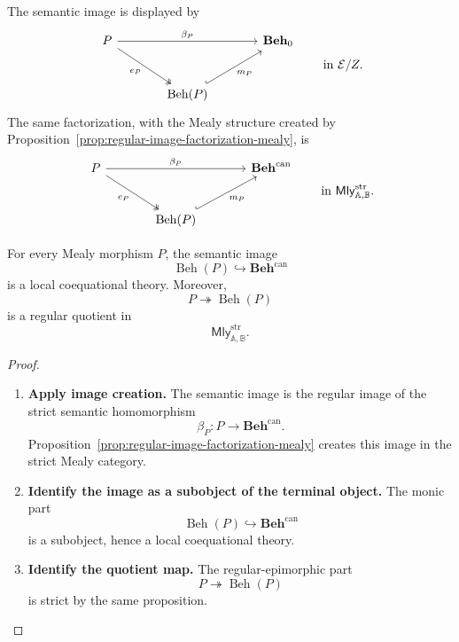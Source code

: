 The semantic image is displayed by
\[
\begin{tikzcd}[column sep=large, row sep=large]
    P
        \arrow[rr, "\beta_P"]
        \arrow[dr, two heads, "e_P"']
    &&
    \mathbf{Beh}_0
    \\
    &
    \operatorname{Beh}(P)
        \arrow[ur, hook, "m_P"']
    &
\end{tikzcd}
\qquad
\text{in }\mathcal E/Z.
\]
The same factorization, with the Mealy structure created by
Proposition~\ref{prop:regular-image-factorization-mealy}, is
\[
\begin{tikzcd}[column sep=large, row sep=large]
    P
        \arrow[rr, "\beta_P"]
        \arrow[dr, two heads, "e_P"']
    &&
    \mathbf{Beh}^{\mathrm{can}}
    \\
    &
    \operatorname{Beh}(P)
        \arrow[ur, hook, "m_P"']
    &
\end{tikzcd}
\qquad
\text{in }\mathsf{Mly}^{\mathrm{str}}_{\mathbb A,\mathbb B}.
\]

\begin{corollary}
\label{cor:semantic-images-are-coeq-theories}
    For every Mealy morphism \(P\), the semantic image
    \[
        \operatorname{Beh}(P)\hookrightarrow\mathbf{Beh}^{\mathrm{can}}
    \]
    is a local coequational theory. Moreover,
    \[
        P\twoheadrightarrow\operatorname{Beh}(P)
    \]
    is a regular quotient in
    \[
        \mathsf{Mly}^{\mathrm{str}}_{\mathbb A,\mathbb B}.
    \]
\end{corollary}

\begin{proof}
    \leavevmode
    \begin{enumerate}
        \item \textbf{Apply image creation.}
        The semantic image is the regular image of the strict semantic
        homomorphism
        \[
            \beta_P:P\to\mathbf{Beh}^{\mathrm{can}}.
        \]
        Proposition~\ref{prop:regular-image-factorization-mealy} creates this
        image in the strict Mealy category.

        \item \textbf{Identify the image as a subobject of the terminal object.}
        The monic part
        \[
            \operatorname{Beh}(P)\hookrightarrow\mathbf{Beh}^{\mathrm{can}}
        \]
        is a subobject, hence a local coequational theory.

        \item \textbf{Identify the quotient map.}
        The regular-epimorphic part
        \[
            P\twoheadrightarrow\operatorname{Beh}(P)
        \]
        is strict by the same proposition.
    \end{enumerate}
\end{proof}

